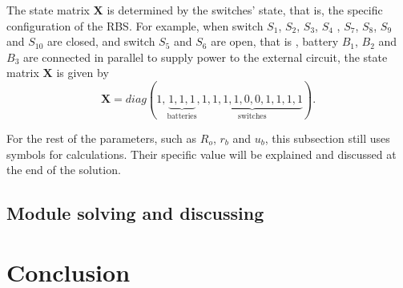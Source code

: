 \documentclass{article}
\begin{document}
The state matrix $\bm{X}$ is determined by the switches' state, that is, the specific configuration of the RBS.
For example, when switch $S_1$, $S_2$, $S_3$, $S_4$ , $S_7$, $S_8$, $S_9$ and $S_{10}$ are closed, and switch $S_5$ and $S_6$ are open, that is , battery $B_1$, $B_2$ and $B_3$ are connected in parallel to supply power to the external circuit, the state matrix $\bm{X}$ is given by
\begin{equation}
    \bm{X} = diag(
        1,  
        \underbrace{1,1,1}_{\text{batteries}}, 
        \underbrace{1,1,1,1,0,0,1,1,1,1}_{\text{switches}}
    ).
\end{equation}


For the rest of the parameters, such as $R_o$, $r_b$ and $u_b$, this subsection still uses symbols for calculations.
Their specific value will be explained and discussed at the end of the solution.

\subsection{Module solving and discussing}

\section{Conclusion}







\end{document}
